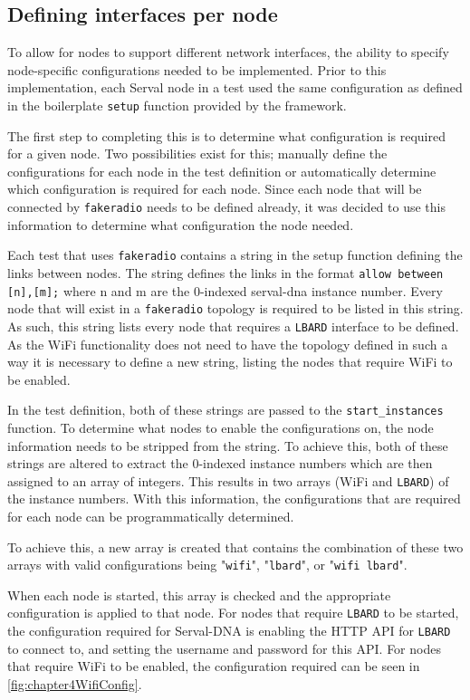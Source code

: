 \subsection{Defining interfaces per node}
\label{subsection:DefiningInterfaces}
To allow for nodes to support different network interfaces, the ability to specify node-specific configurations needed to be implemented.
Prior to this implementation, each Serval node in a test used the same configuration as defined in the boilerplate \texttt{setup} function provided by the framework.

The first step to completing this is to determine what configuration is required for a given node.
Two possibilities exist for this; manually define the configurations for each node in the test definition or automatically determine which configuration is required for each node.
Since each node that will be connected by \texttt{fakeradio} needs to be defined already, it was decided to use this information to determine what configuration the node needed.

Each test that uses \texttt{fakeradio} contains a string in the setup function defining the links between nodes.
The string defines the links in the format \texttt{allow between [n],[m];} where n and m are the 0-indexed serval-dna instance number.
Every node that will exist in a \texttt{fakeradio} topology is required to be listed in this string.
As such, this string lists every node that requires a \texttt{LBARD} interface to be defined.
As the WiFi functionality does not need to have the topology defined in such a way it is necessary to define a new string, listing the nodes that require WiFi to be enabled. 

In the test definition, both of these strings are passed to the \texttt{start\_instances} function.
To determine what nodes to enable the configurations on, the node information needs to be stripped from the string.
To achieve this, both of these strings are altered to extract the 0-indexed instance numbers which are then assigned to an array of integers.
This results in two arrays (WiFi and \texttt{LBARD}) of the instance numbers.
With this information, the configurations that are required for each node can be programmatically determined.

To achieve this, a new array is created that contains the combination of these two arrays with valid configurations being "\texttt{wifi}", "\texttt{lbard}", or "\texttt{wifi lbard}".

When each node is started, this array is checked and the appropriate configuration is applied to that node.
For nodes that require \texttt{LBARD} to be started, the configuration required for Serval-DNA is enabling the HTTP API for \texttt{LBARD} to connect to, and setting the username and password for this API.
For nodes that require WiFi to be enabled, the configuration required can be seen in \figurename{ \ref{fig:chapter4WifiConfig}}.


